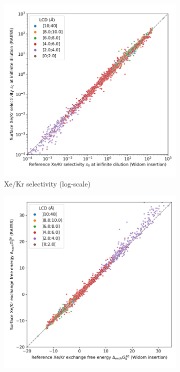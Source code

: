 \documentclass[main]{subfiles}
\begin{document}
\begin{figure}[ht]
\centering
\begin{subfigure}[b]{0.48\textwidth}
  \centering
  \includegraphics[width=\textwidth]{figures/3-fastsim/s_0_widom_vs_s_0_surface_zoom.jpg}
  \caption{Xe/Kr selectivity (log-scale)}\label{fgr:s_0}
\end{subfigure}
\hfill
\begin{subfigure}[b]{0.48\textwidth}
  \centering
    \includegraphics[width=\textwidth]{figures/3-fastsim/G_XeKr_widom_vs_G_XeKr_surface_zoom.jpg}

\end{subfigure}
\end{figure}
\end{document}
